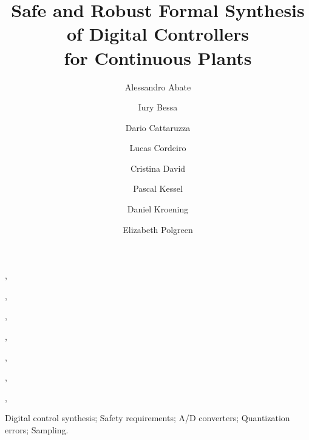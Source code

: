 \documentclass[twocolumn]{autart}    %
\begin{document}
\newcommand\tool{{\sf DSSynth}}
\begin{frontmatter}



\title{Safe and Robust Formal Synthesis of Digital Controllers\\
for Continuous Plants}


\author[oxford]{Alessandro Abate},
\author[manaus]{Iury Bessa},
\author[oxford]{Dario Cattaruzza},
\author[oxford,manaus]{Lucas Cordeiro},
\author[cambridge]{Cristina David},
\author[oxford]{Pascal Kessel},
\author[oxford]{Daniel Kroening},
\author[oxford]{Elizabeth Polgreen}

\address[oxford]{University of Oxford, UK}
\address[cambridge]{University of Cambridge, UK}
\address[manaus]{Federal University of Amazonas, Brazil} 
          
\begin{keyword}                           %
Digital control synthesis; Safety requirements; A/D converters; Quantization errors; Sampling.               %
\end{keyword}                             %




\end{frontmatter}
\end{document}
